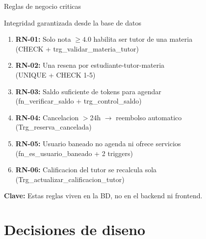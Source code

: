 ﻿\documentclass[11pt,aspectratio=169]{beamer}
\begin{document}
\begin{frame}{Reglas de negocio criticas}
    \begin{block}{Integridad garantizada desde la base de datos}
        \begin{enumerate}
            \item \textbf{RN-01:} Solo nota $\geq 4.0$ habilita ser tutor de una materia \\ {\footnotesize (CHECK + trg\_validar\_materia\_tutor)}
            \item \textbf{RN-02:} Una resena por estudiante-tutor-materia \\ {\footnotesize (UNIQUE + CHECK 1-5)}
            \item \textbf{RN-03:} Saldo suficiente de tokens para agendar \\ {\footnotesize (fn\_verificar\_saldo + trg\_control\_saldo)}
            \item \textbf{RN-04:} Cancelacion $>$24h $\rightarrow$ reembolso automatico \\ {\footnotesize (Trg\_reserva\_cancelada)}
            \item \textbf{RN-05:} Usuario baneado no agenda ni ofrece servicios \\ {\footnotesize (fn\_es\_usuario\_baneado + 2 triggers)}
            \item \textbf{RN-06:} Calificacion del tutor se recalcula sola \\ {\footnotesize (Trg\_actualizar\_calificacion\_tutor)}
        \end{enumerate}
    \end{block}
    {\small \textbf{Clave:} Estas reglas viven en la BD, no en el backend ni frontend.}
\end{frame}

\section{Decisiones de diseno}
\end{document}
